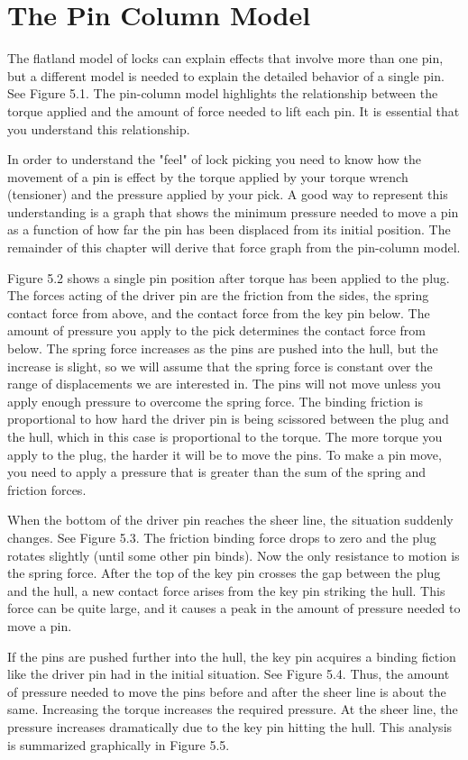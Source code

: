 \chapter{The Pin Column Model}
The flatland model of locks can explain effects that involve more than one pin, but a different
model is needed to explain the detailed behavior of a single pin. See Figure 5.1.
The pin-column model highlights the relationship between the torque applied and the amount of force
needed to lift each pin. It is essential that you understand this relationship.

In order to understand the "feel" of lock picking you need to know how the movement
of a pin is effect by the torque applied by your torque wrench (tensioner) and the pressure
applied by your pick. A good way to represent this understanding is a graph that shows the
minimum pressure needed to move a pin as a function of how far the pin has been displaced
from its initial position. The remainder of this chapter will derive that force graph from the
pin-column model.

Figure 5.2 shows a single pin position after torque has been applied to the plug. The
forces acting of the driver pin are the friction from the sides, the spring contact force from
above, and the contact force from the key pin below. The amount of pressure you apply to
the pick determines the contact force from below.
The spring force increases as the pins are pushed into the hull, but the increase is slight,
so we will assume that the spring force is constant over the range of displacements we
are interested in. The pins will not move unless you apply enough pressure to overcome
the spring force. The binding friction is proportional to how hard the driver pin is being
scissored between the plug and the hull, which in this case is proportional to the torque. The
more torque you apply to the plug, the harder it will be to move the pins. To make a pin
move, you need to apply a pressure that is greater than the sum of the spring and friction
forces.

When the bottom of the driver pin reaches the sheer line, the situation suddenly changes.
See Figure 5.3. The friction binding force drops to zero and the plug rotates slightly (until
some other pin binds). Now the only resistance to motion is the spring force. After the
top of the key pin crosses the gap between the plug and the hull, a new contact force arises
from the key pin striking the hull. This force can be quite large, and it causes a peak in the
amount of pressure needed to move a pin.

If the pins are pushed further into the hull, the key pin acquires a binding fiction like the
driver pin had in the initial situation. See Figure 5.4. Thus, the amount of pressure needed
to move the pins before and after the sheer line is about the same. Increasing the torque
increases the required pressure. At the sheer line, the pressure increases dramatically due to
the key pin hitting the hull. This analysis is summarized graphically in Figure 5.5.
